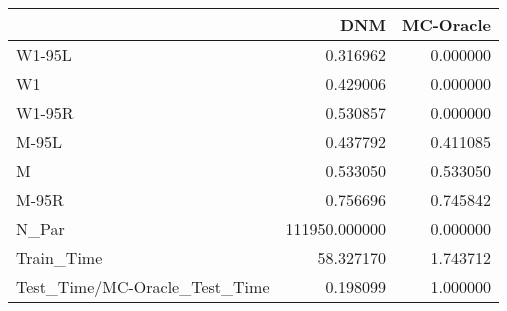 \begin{tabular}{lrr}
\toprule
{} &            DNM &  MC-Oracle \\
\midrule
W1-95L                        &       0.316962 &   0.000000 \\
W1                            &       0.429006 &   0.000000 \\
W1-95R                        &       0.530857 &   0.000000 \\
M-95L                         &       0.437792 &   0.411085 \\
M                             &       0.533050 &   0.533050 \\
M-95R                         &       0.756696 &   0.745842 \\
N\_Par                         &  111950.000000 &   0.000000 \\
Train\_Time                    &      58.327170 &   1.743712 \\
Test\_Time/MC-Oracle\_Test\_Time &       0.198099 &   1.000000 \\
\bottomrule
\end{tabular}
